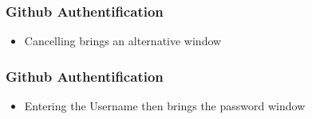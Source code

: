 \documentclass[12pt,english]{beamer}
\begin{document}
\begin{frame}
\frametitle{Github Authentification}

\begin{itemize}
	\item Cancelling brings an alternative window
\end{itemize}


\end{frame}


\begin{frame}
\frametitle{Github Authentification}

\begin{itemize}
	\item Entering the Username then brings the password window
\end{itemize}


\end{frame}
\end{document}
